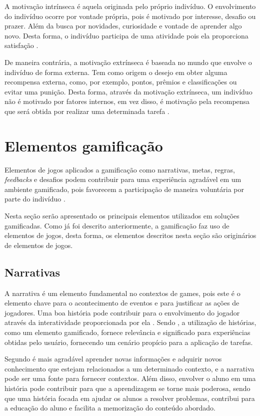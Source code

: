 \documentclass[
	12pt,				%
	oneside,			%
	a4paper,			%
	english,			%
	french,				%
	spanish,			%
	brazil,				%
	]{abntex2}
\begin{document}
A motivação intrínseca é aquela originada pelo próprio indivíduo. O envolvimento do indivíduo ocorre por vontade própria,  pois é motivado por interesse, desafio ou prazer. Além da busca por novidades, curiosidade e vontade de aprender algo novo. Desta forma, o indivíduo participa de uma atividade pois ela proporciona satisfação \cite{busarello2016gamificaccao}.

De maneira contrária, a motivação extrínseca é baseada no mundo que envolve o indivíduo de forma externa. Tem como origem o desejo em obter alguma recompensa externa, como, por exemplo, pontos, prêmios e classificações ou evitar uma punição. Desta forma, através da motivação extrínseca, um indivíduo não é motivado por fatores internos, em vez disso, é motivação pela recompensa que será obtida por realizar uma determinada tarefa \cite{busarello2016gamificaccao}.

\section{Elementos gamificação}

Elementos de jogos aplicados a gamificação como narrativas, metas, regras, \textit{feedbacks} e desafios podem contribuir para uma experiência agradável em um ambiente gamificado, pois favorecem a participação de maneira voluntária por parte do indivíduo \cite{busarello2016gamificaccao}.

Nesta seção serão apresentado os principais elementos utilizados em soluções gamificadas. Como já foi descrito anteriormente, a gamificação faz uso de elementos de jogos, desta forma, os elementos descritos nesta seção são originários de elementos de jogos.

\subsection{Narrativas}

A narrativa é um elemento fundamental no contextos de games, pois este é o elemento chave para o acontecimento de eventos e para justificar as ações de jogadores. Uma boa história pode contribuir para o envolvimento do jogador através da interatividade proporcionada por ela  \cite{fardo2013gamificaccao}. Sendo \citet{kaap:2014}, a utilização de histórias, como um elemento gamificado, fornece relevância e significado para experiências obtidas pelo usuário, fornecendo um cenário propício para a aplicação de tarefas.

Segundo \citet{fardo2013gamificaccao} é mais agradável aprender novas informações e adquirir novos conhecimento que estejam relacionados a um determinado contexto, e a narrativa pode ser uma fonte para fornecer contextos. Além disso, envolver o aluno em uma história pode contribuir para que a aprendizagem se torne mais poderosa, sendo que uma história focada em ajudar os alunos a resolver problemas, contribui para a educação do aluno e facilita a memorização do conteúdo abordado.
\end{document}
